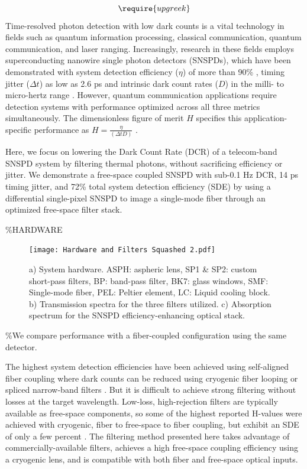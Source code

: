 \documentclass[12pt]{caltech_thesis}
\begin{document}
\[ \require{upgreek} \] Time-resolved photon detection with low dark
counts is a vital technology in fields such as quantum information
processing, classical communication, quantum communication, and laser
ranging. Increasingly, research in these fields employs superconducting
nanowire single photon detectors (SNSPDs), which have been demonstrated
with system detection efficiency (\(\eta\)) of more than 90\%
\autocite{Reddy2020}, timing jitter (\(\Delta t\)) as low as 2.6 ps
\autocite{Korzh2020} and intrinsic dark count rates (\(D\)) in the
milli- to micro-hertz range \autocite{Hochberg2019}. However, quantum
communication applications require detection systems with performance
optimized across all three metrics simultaneously. The dimensionless
figure of merit \(H\) specifies this application-specific performance as
\(H = \frac{\eta}{(\Delta t D)}\) \autocite{Hadfield2009}.

Here, we focus on lowering the Dark Count Rate (DCR) of a telecom-band
SNSPD system by filtering thermal photons, without sacrificing
efficiency or jitter. We demonstrate a free-space coupled SNSPD with
sub-0.1 Hz DCR, 14 ps timing jitter, and 72\% total system detection
efficiency (SDE) by using a differential single-pixel SNSPD
\autocite{Colangelo2021} to image a single-mode fiber through an
optimized free-space filter stack.

\%HARDWARE

\begin{figure}[htbp]
\centering\texttt{[image: Hardware and Filters Squashed 2.pdf]}
\caption{\small a) System hardware. ASPH: aspheric lens, %
SP1 \& SP2: custom short-pass filters, BP: band-pass filter, %
BK7: glass windows, SMF: Single-mode fiber, PEL: Peltier element, LC: Liquid cooling block. b) Transmission spectra for the three filters utilized. c) Absorption spectrum for the SNSPD efficiency-enhancing optical stack.}
\label{fig:setup}
\end{figure}

\%We compare performance with a fiber-coupled configuration using the
same detector.

The highest system detection efficiencies have been achieved using
self-aligned fiber coupling where dark counts can be reduced using
cryogenic fiber looping \autocite{Cohen2015} or spliced narrow-band
filters \autocite{Boaron2018secure}. But it is difficult to achieve
strong filtering without losses at the target wavelength. Low-loss,
high-rejection filters are typically available as free-space components,
so some of the highest reported H-values were achieved with cryogenic,
fiber to free-space to fiber coupling, but exhibit an SDE of only a few
percent \autocite{Shibata2015}. The filtering method presented here
takes advantage of commercially-available filters, achieves a high
free-space coupling efficiency using a cryogenic lens, and is compatible
with both fiber and free-space optical inputs.
\end{document}
